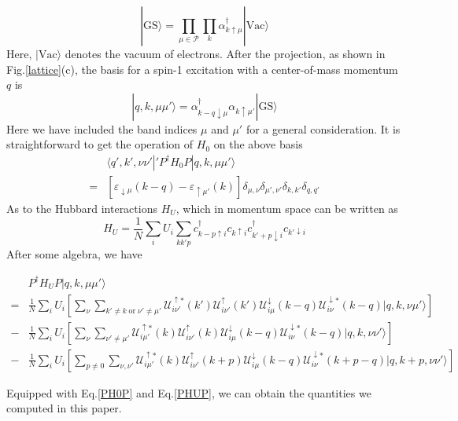 \documentclass[amsmath,superscriptaddress,showpacs,aps,prb,twocolumn]{revtex4-1}
\begin{document}
\begin{equation}\label{GS}
|\text{GS}\rangle=\prod_{\mu\in\mathcal{P}}\prod_{k}\alpha^\dagger_{k\uparrow\mu}|\text{Vac}\rangle
\end{equation}
Here, $|\text{Vac}\rangle$ denotes the vacuum of electrons. After the projection, as shown in Fig.\ref{lattice}(c), the basis for a spin-1 excitation with a center-of-mass momentum $q$ is
\begin{equation}\label{basis}
  |q,k,\mu\mu'\rangle=\alpha^\dagger_{k-q\downarrow\mu}\alpha_{k\uparrow\mu'}|\text{GS}\rangle
\end{equation}
Here we have included the band indices $\mu$ and $\mu'$ for a general consideration.
It is straightforward to get the operation of $H_0$ on the above basis
\begin{equation}\label{PH0P}
\begin{aligned}
  &\langle q',k',\nu\nu'|'P^\dagger H_0P|q,k,\mu\mu'\rangle \\
  =& \left[\varepsilon_{\downarrow\mu}(k-q)-\varepsilon_{\uparrow\mu'}(k)\right]\delta_{\mu,\nu}\delta_{\mu',\nu'}\delta_{k,k'}\delta_{q,q'}
\end{aligned}
\end{equation}
As to the Hubbard interactions $H_U$, which in momentum space can be written as
\begin{equation}\label{Hubbard}
  H_U=\frac{1}{N}\sum_{i}U_i\sum_{kk'p}c^\dagger_{k-p\uparrow i}c_{k\uparrow i}c^\dagger_{k'+p\downarrow i}c_{k'\downarrow i}
\end{equation}
After some algebra, we have
\begin{widetext}
\begin{equation}\label{PHUP}
\begin{aligned}
  &P^\dagger H_U P|q,k,\mu\mu'\rangle    \\
    =&\frac{1}{N}\sum_iU_i\left[
        \sum_\nu\sum_{k'\neq k\;\text{or}\;\nu'\neq\mu'}\mathcal{U}^{\uparrow*}_{i\nu'}(k')\mathcal{U}^\uparrow_{i\nu'}(k')
        \mathcal{U}^\downarrow_{i\mu}(k-q)\mathcal{U}^{\downarrow*}_{i\nu}(k-q)|q,k,\nu\mu'\rangle
    \right]     \\
    -&\frac{1}{N}\sum_iU_i\left[
        \sum_\nu\sum_{\nu'\neq\mu'}\mathcal{U}^{\uparrow*}_{i\mu'}(k)\mathcal{U}^\uparrow_{i\nu'}(k)
        \mathcal{U}^\downarrow_{i\mu}(k-q)\mathcal{U}^{\downarrow*}_{i\nu}(k-q)|q,k,\nu\nu'\rangle
    \right]     \\
    -&\frac{1}{N}\sum_iU_i\left[
        \sum_{p\neq0}\sum_{\nu,\nu'}\mathcal{U}^{\uparrow*}_{i\mu'}(k)\mathcal{U}^\uparrow_{i\nu'}(k+p)
        \mathcal{U}^\downarrow_{i\mu}(k-q)\mathcal{U}^{\downarrow*}_{i\nu}(k+p-q)|q,k+p,\nu\nu'\rangle
    \right]
\end{aligned}
\end{equation}
\end{widetext}
Equipped with Eq.\ref{PH0P} and Eq.\ref{PHUP}, we can obtain the quantities we computed in this paper.
\end{document}
